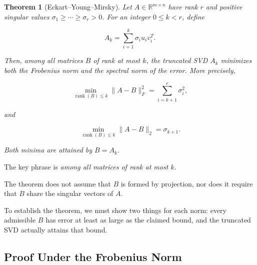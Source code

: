 \documentclass[11pt]{article}
\newtheorem{theorem}{Theorem}[section]
\begin{document}
\begin{theorem}[Eckart--Young--Mirsky]

Let $A\in\mathbb{R}^{m\times n}$ have rank
$r$ and positive singular values
$\sigma_1\geq\cdots\geq\sigma_r>0$.
For an integer $0\leq k<r$, define

\[
A_k=\sum_{i=1}^{k}\sigma_i u_i v_i^T.
\]

Then, among all matrices $B$ of rank
at most $k$, the truncated SVD $A_k$
minimizes both the Frobenius norm
and the spectral norm of the error.
More precisely,

\[
\boxed{
\min_{\operatorname{rank}(B)\leq k}
\|A-B\|_F^2
=\sum_{i=k+1}^{r}\sigma_i^2,
}
\]

and

\[
\boxed{
\min_{\operatorname{rank}(B)\leq k}
\|A-B\|_2=\sigma_{k+1}.
}
\]

Both minima are attained by $B=A_k$.

\end{theorem}

The key phrase is \textit{among all
matrices of rank at most $k$}.

The theorem does not assume that $B$
is formed by projection, nor does it
require that $B$ share the singular
vectors of $A$.

To establish the theorem, we must show
two things for each norm: every admissible
$B$ has error at least as large as the
claimed bound, and the truncated SVD
actually attains that bound.

\subsection{Proof Under the Frobenius Norm}
\end{document}
